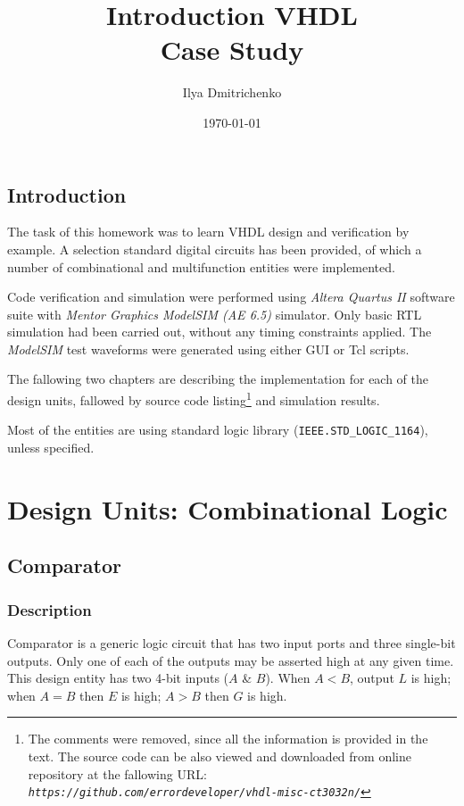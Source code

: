 \documentclass[10pt,a4paper]{report}
\author{Ilya Dmitrichenko}
\title{Introduction VHDL \\ Case Study}
\date{\today}
\begin{document}
\maketitle

\section*{Introduction}

 The task of this homework was to learn
 VHDL design and verification by example.
 A selection standard digital circuits
 has been provided, of which a number
 of combinational and multifunction
 entities were implemented.

 Code verification and simulation were
 performed using \emph{Altera Quartus II}
 software suite with \emph{Mentor Graphics
 ModelSIM (AE 6.5)} simulator.
 Only basic RTL simulation had been
 carried out, without any timing constraints
 applied. The \emph{ModelSIM} test waveforms
 were generated using either GUI or Tcl scripts.

 The fallowing two chapters are describing
 the implementation for each of the design
 units, fallowed by source code listing\footnote{
 The comments were removed, since all the
 information is provided in the text. The
 source code can be also viewed and downloaded
 from online repository at the fallowing URL: \\
 \emph{\texttt{https://github.com/errordeveloper/vhdl-misc-ct3032n/}}}
 and simulation results.

 Most of the entities are using standard
 logic library (\texttt{IEEE.STD\_LOGIC\_1164}),
 unless specified.

\tableofcontents

\chapter{Design Units: Combinational Logic}

\section{Comparator}

\subsection{Description}

 Comparator is a generic logic circuit that
 has two input ports and three single-bit
 outputs. Only one of each of the outputs
 may be asserted high at any given time.
 This design entity has two 4-bit inputs
 ($A$ \& $B$). When $A < B$, output $L$
 is high; when $A = B$ then $E$ is high;
 $A > B$ then $G$ is high.
\end{document}
